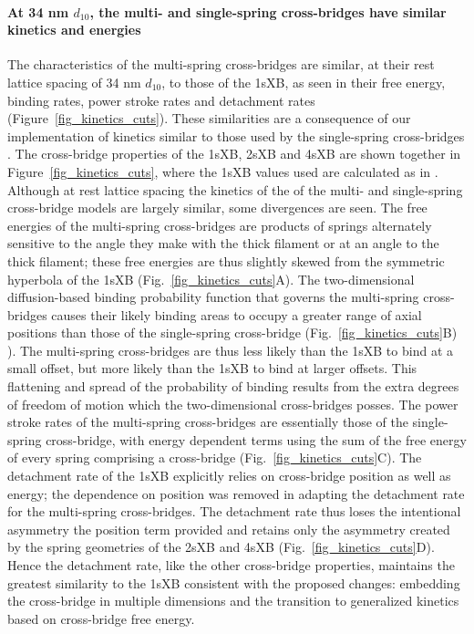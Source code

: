 \documentclass[]{article}
\begin{document}
\paragraph{At 34 nm $d_{10}$, the multi- and single-spring cross-bridges have similar kinetics and energies} %
The characteristics of the multi-spring cross-bridges are similar, at their rest lattice spacing of 34 nm $d_{10}$, to those of the 1sXB, as seen in their free energy, binding rates, power stroke rates and detachment rates (Figure~\ref{fig_kinetics_cuts}). 
These similarities are a consequence of our implementation of kinetics similar to those used by the single-spring cross-bridges \citep{Pate1989}.
The cross-bridge properties of the 1sXB, 2sXB and 4sXB are shown together in Figure~\ref{fig_kinetics_cuts}, where the 1sXB values used are calculated as in \citet[Fig.~10]{Tanner2007}. 
Although at rest lattice spacing the kinetics of the of the multi- and single-spring cross-bridge models are largely similar, some divergences are seen. 
The free energies of the multi-spring cross-bridges are products of springs alternately sensitive to the angle they make with the thick filament or at an angle to the thick filament; these free energies are thus slightly skewed from the symmetric hyperbola of the 1sXB  (Fig.~\ref{fig_kinetics_cuts}A).
The two-dimensional diffusion-based binding probability function that governs the multi-spring cross-bridges causes their likely binding areas to occupy a greater range of axial positions than those of the single-spring cross-bridge (Fig.~\ref{fig_kinetics_cuts}B) \citep{BergBook, DillBook}).
The multi-spring cross-bridges are thus less likely than the 1sXB to bind at a small offset, but more likely than the 1sXB to bind at larger offsets. 
This flattening and spread of the probability of binding results from the extra degrees of freedom of motion which the two-dimensional cross-bridges posses. 
The power stroke rates of the multi-spring cross-bridges are essentially those of the single-spring cross-bridge, with energy dependent terms using the sum of the free energy of every spring comprising a cross-bridge (Fig.~\ref{fig_kinetics_cuts}C). 
The detachment rate of the 1sXB explicitly relies on cross-bridge position as well as energy; the dependence on position was removed in adapting the detachment rate for the multi-spring cross-bridges. 
The detachment rate thus loses the intentional asymmetry the position term provided and retains only the asymmetry created by the spring geometries of the 2sXB and 4sXB (Fig.~\ref{fig_kinetics_cuts}D). 
Hence the detachment rate, like the other cross-bridge properties, maintains the greatest similarity to the 1sXB consistent with the proposed changes: embedding the cross-bridge in multiple dimensions and the transition to generalized kinetics based on cross-bridge free energy. 
\end{document}
